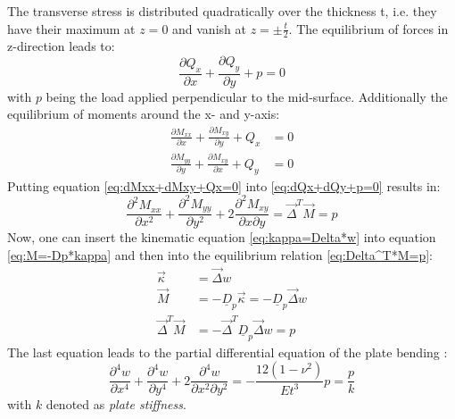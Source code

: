   The transverse stress is distributed quadratically over the thickness t, i.e. they have their maximum at $z=0$ and vanish at $z = \pm \frac{t}{2}$. The equilibrium of forces in z-direction leads to:
  \begin{equation}\label{eq:dQx+dQy+p=0}
  \frac{\partial Q_x}{\partial x} + \frac{\partial Q_y}{\partial y} + p = 0
  \end{equation}
  with $p$ being the load applied perpendicular to the mid-surface. Additionally the equilibrium of moments around the x- and y-axis:\\
  \begin{align}\label{eq:dMxx+dMxy+Qx=0}
  \frac{\partial M_{xx}}{\partial x} + \frac{\partial M_{xy}}{\partial y} + Q_x &= 0 \nonumber\\
  \frac{\partial M_{yy}}{\partial y} + \frac{\partial M_{xy}}{\partial x} + Q_y &= 0
  \end{align}
  Putting equation \eqref{eq:dMxx+dMxy+Qx=0} into \eqref{eq:dQx+dQy+p=0} results in:
  \begin{equation}\label{eq:Delta^T*M=p}
  \frac{\partial^2 M_{xx}}{\partial x^2} + \frac{\partial^2 M_{yy}}{\partial y^2} + 2\frac{\partial^2 M_{xy}}{\partial x\partial y} = \vec{\Delta}^T \vec{M} = p
  \end{equation}
  Now, one can insert the kinematic equation \eqref{eq:kappa=Delta*w} into equation \eqref{eq:M=-Dp*kappa} and then into the equilibrium relation \eqref{eq:Delta^T*M=p}:
  \begin{align}
  \vec{\kappa} &= \vec{\Delta}w \nonumber\\
  \vec{M} &= -\underline{D}_p \vec{\kappa} = -\underline{D}_p \vec{\Delta} w \nonumber\\
  \vec{\Delta}^T \vec{M} &= -\vec{\Delta}^T \underline{D}_p \vec{\Delta} w = p
  \end{align}
  The last equation leads to the partial differential equation of the plate bending \cite{klein2013fem}:
  \begin{equation}
  \frac{\partial^4 w}{\partial x^4} + \frac{\partial^4 w}{\partial y^4} + 2\frac{\partial^4 w}{\partial x^2 \partial y^2} = -\frac{12(1-\nu^2)}{E t^3} p = \frac{p}{k}
  \end{equation}
  with $k$ denoted as \textit{plate stiffness}.
  
